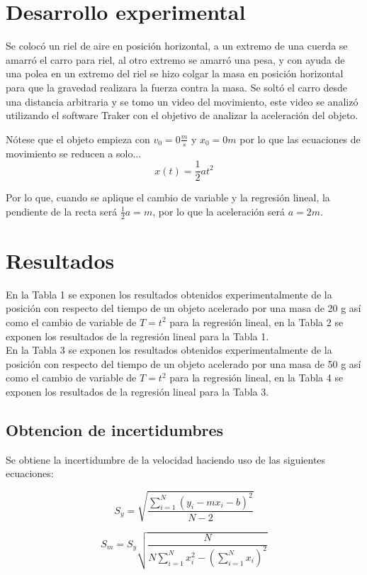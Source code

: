 \documentclass[12pt,a4paper]{article}
\begin{document}
\section{Desarrollo experimental}

Se colocó un riel de aire en posición horizontal, a un extremo de una cuerda se amarró el carro para riel, al otro extremo se amarró una pesa, y con ayuda de una polea en un extremo del riel se hizo colgar la masa en posición horizontal para que la gravedad realizara la fuerza contra la masa. 
Se soltó el carro desde una distancia arbitraria y se tomo un video del movimiento, este video se analizó utilizando el software Traker con el objetivo de analizar la aceleración del objeto. 

Nótese que el objeto empieza con $v_0 = 0 \frac{m}{s}$ y $x_0 = 0 m$ por lo que las ecuaciones de movimiento se reducen a solo...
\[x(t) = \frac{1}{2} a t^2\]

Por lo que, cuando se aplique el cambio de variable y la regresión lineal, la pendiente de la recta será $\frac{1}{2}a = m$, por lo que la aceleración será $a = 2m$.

\section{Resultados}

En la Tabla 1 se exponen los resultados obtenidos experimentalmente de la posición con respecto del tiempo de un objeto acelerado por una masa de 20 g así como el cambio de variable de $T = t^2$ para la regresión lineal, en la Tabla 2 se exponen los resultados de la regresión lineal para la Tabla 1.\\ 
En la Tabla 3 se exponen los resultados obtenidos experimentalmente de la posición con respecto del tiempo de un objeto acelerado por una masa de 50 g así como el cambio de variable de $T = t^2$ para la regresión lineal, en la Tabla 4 se exponen los resultados de la regresión lineal para la Tabla 3. \\

\subsection{Obtencion de incertidumbres}

Se obtiene la incertidumbre de la velocidad haciendo uso de las siguientes ecuaciones:

\[S_y = \sqrt{\frac{\sum_{i=1}^N (y_i - mx_i - b)^2}{N-2}}\] 

\[S_m = S_y \sqrt{\frac{N}{N\sum_{i=1}^N x_i^2 - \left(\sum_{i=1}^N  x_i\right)^2}}\]
\end{document}

